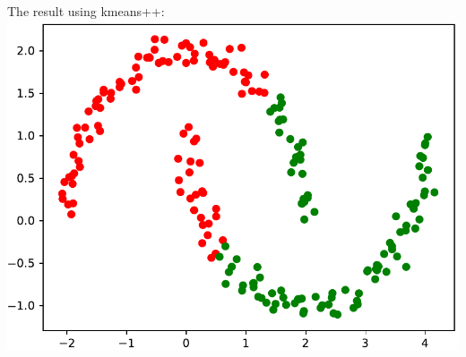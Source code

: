 \documentclass{beamer}
\begin{document}
\begin{frame}
The result using kmeans++:
\includegraphics[width=\linewidth]{graphics/task_3_2_kmeans}
\end{frame}
\end{document}

